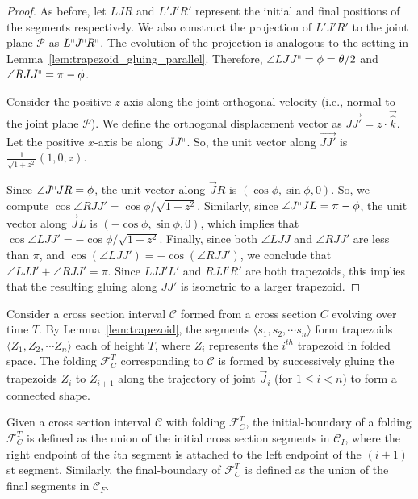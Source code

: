 \begin{proof}
As before, let $LJR$ and $L'J'R'$ represent the initial and final positions of the segments respectively.
We also construct the projection of $L'J'R'$ to the joint plane $\mathcal P$ as $L^\shortparallel J^\shortparallel R^\shortparallel$.
The evolution of the projection is analogous to the setting in Lemma~\ref{lem:trapezoid_gluing_parallel}.
Therefore, $\angle LJJ^\shortparallel = \phi = \theta/2$ and $\angle RJJ^\shortparallel = \pi-\phi$.

Consider the positive $z$-axis along the joint orthogonal velocity (i.e., normal to the joint plane $\mathcal P$).
We define the orthogonal displacement vector as $\overrightarrow{JJ'} = z\cdot\vec{\hat k}$.
Let the positive $x$-axis be along $JJ^\shortparallel$. So, the unit vector along $\overrightarrow{JJ'}$ is $\frac{1}{\sqrt{1+z^2}}(1,0,z)$.

Since $\angle J^\shortparallel JR = \phi$, the unit vector along $\overrightarrow JR$ is $(\cos\phi,\sin\phi,0)$.
So, we compute $\cos \angle RJJ' = \cos\phi/\sqrt{1+z^2}$.
Similarly, since $\angle J^\shortparallel JL = \pi-\phi$, the unit vector along $\overrightarrow JL$ is $(-\cos\phi,\sin\phi,0)$,
which implies that $\cos \angle LJJ' = -\cos\phi/\sqrt{1+z^2}$.
Finally, since both $\angle LJJ$ and $\angle RJJ'$ are less than $\pi$, and $\cos\left(\angle LJJ' \right) = -\cos\left(\angle RJJ' \right)$,
we conclude that $\angle LJJ' + \angle RJJ' = \pi$.
Since $LJJ'L'$ and $RJJ'R'$ are both trapezoids, this implies that the resulting gluing along $JJ'$ is isometric to a larger trapezoid.
\end{proof}

\begin{definition}
\label{def:interval_folding}
Consider a cross section interval $\mathcal C$ formed from a cross section $C$ evolving over time $T$.
By Lemma~\ref{lem:trapezoid}, the segments $ \langle s_1, s_2,\cdots s_n \rangle$ form trapezoids
$ \langle Z_1, Z_2,\cdots Z_n \rangle$ each of height $T$, where $Z_i$ represents the $i^{th}$ trapezoid in folded space.
The folding $\mathcal F_C^T$ corresponding to $\mathcal C$ is formed by successively gluing the trapezoids
$Z_i$ to $Z_{i+1}$ along the trajectory of joint $\vec J_i$ (for $1\le i<n$) to form a connected shape.
\end{definition}

\begin{definition}
\label{def:interval_folding_boundary}
Given a cross section interval $\mathcal C$ with folding $\mathcal F_C^T$,
the initial-boundary of a folding $\mathcal F_C^T$ is defined as the union of the initial cross section segments in $\mathcal C_I$,
where the right endpoint of the $i$th segment is attached to the left endpoint of the $(i+1)$st segment.
Similarly, the final-boundary of $\mathcal F_C^T$ is defined as the union of the final segments in $\mathcal C_F$.
\end{definition}

